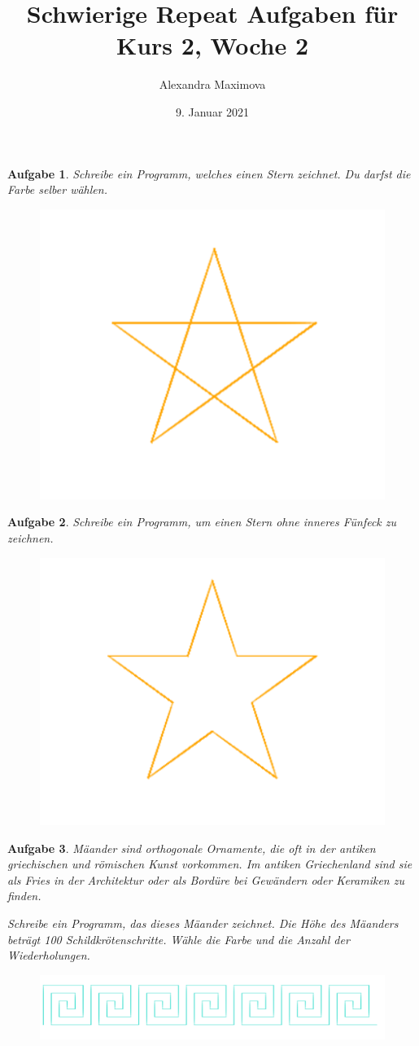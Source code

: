 \documentclass{article}
\title{Schwierige Repeat Aufgaben für Kurs 2, Woche 2}
\author{Alexandra Maximova}
\date{9. Januar 2021}
\newtheorem{aufgabe}{Aufgabe}[section]
\begin{document}
\maketitle

\begin{aufgabe} \label{stern_einfach}
Schreibe ein Programm, welches einen Stern zeichnet. Du darfst die Farbe selber wählen.
\begin{figure}[H]
\centering
\includegraphics[width=0.35\linewidth]{pictures/stern1.png}
\end{figure}
\end{aufgabe}

\begin{aufgabe} \label{stern_rand}
Schreibe ein Programm, um einen Stern ohne inneres Fünfeck zu zeichnen.
\begin{figure}[H]
\centering
\includegraphics[width=0.35\linewidth]{pictures/stern2.png}
\end{figure}
\end{aufgabe}

\begin{aufgabe} \label{meander}
Mäander sind orthogonale Ornamente, die oft in der antiken griechischen und römischen Kunst vorkommen. Im antiken Griechenland sind sie als Fries in der Architektur oder als Bordüre bei Gewändern oder Keramiken zu finden.

Schreibe ein Programm, das dieses Mäander zeichnet. Die Höhe des Mäanders beträgt 100 Schildkrötenschritte. Wähle die Farbe und die Anzahl der Wiederholungen.
\begin{figure}[H]
\centering
\includegraphics[width=0.9\linewidth]{pictures/greek-meander.png}
\end{figure}
\end{aufgabe}
\end{document}
